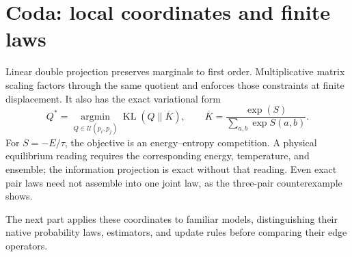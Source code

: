 \section*{Coda: local coordinates and finite laws}

Linear double projection preserves marginals to first order.  Multiplicative matrix scaling
factors through the same quotient and enforces those constraints at finite displacement.  It
also has the exact variational form
\begin{equation}
Q^*=\underset{Q\in\mathcal U(p_i,p_j)}{\operatorname{argmin}}
\operatorname{KL}(Q\|\overline K),
\qquad
\overline K=\frac{\exp(S)}{\sum_{a,b}\exp S(a,b)}.
\label{eq:book-sinkhorn-information-projection}
\end{equation}
For $S=-E/\tau$, the objective is an energy--entropy competition.  A physical equilibrium reading
requires the corresponding energy, temperature, and ensemble; the information projection is
exact without that reading.  Even exact pair laws need not assemble into one joint law, as the
three-pair counterexample shows.

The next part applies these coordinates to familiar models, distinguishing their native
probability laws, estimators, and update rules before comparing their edge operators.
